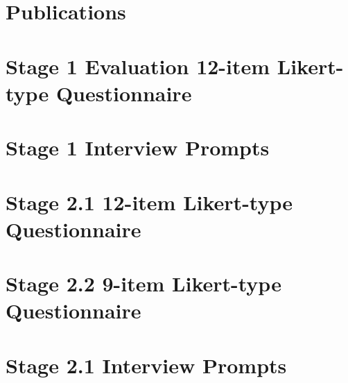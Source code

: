 \documentclass[a4paper]{report}
\begin{document}



\begin{appendices}

\chapter{Publications}
\label{publications}


\chapter{Stage 1 Evaluation 12-item Likert-type Questionnaire}

\label{appendix-12-item-likert-type-questionnaire-stage-1}

\chapter{Stage 1 Interview Prompts}

\label{appendix-interview-questions-stage-1}

\chapter{Stage 2.1 12-item Likert-type Questionnaire}

\label{appendix-12-item-likert-type-questionnaire-stage-2-1}

\chapter{Stage 2.2 9-item Likert-type Questionnaire}

\label{appendix-9-item-likert-type-questionnaire-stage-2-2}

\chapter{Stage 2.1 Interview Prompts}

\label{appendix-interview-questions-stage-2-1}


\end{appendices}
\end{document}
